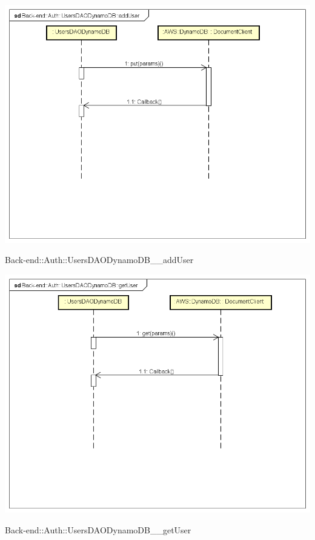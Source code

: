 \includegraphics[width=\textwidth,height=\textheight,keepaspectratio]{images/diagrams/back-end/Ufficial_Backend/Back-end__Auth__UsersDAODynamoDB__addUser.png} 	\caption{Back-end::Auth::UsersDAODynamoDB__addUser}
\includegraphics[width=\textwidth,height=\textheight,keepaspectratio]{images/diagrams/back-end/Ufficial_Backend/Back-end__Auth__UsersDAODynamoDB__getUser.png} 	\caption{Back-end::Auth::UsersDAODynamoDB__getUser}
